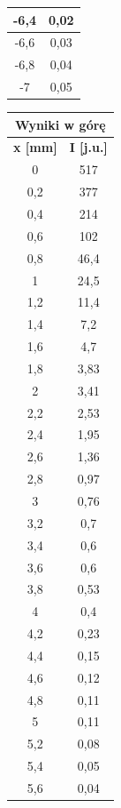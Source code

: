 \documentclass{fizykalab}
\begin{document}
\begin{table}
\begin{tabular}{|c|c|}
        -6,4 & 0,02 \\ \hline
        -6,6 & 0,03 \\ \hline
        -6,8 & 0,04 \\ \hline
        -7 & 0,05 \\ \hline
    \end{tabular}
    \quad
    \quad
    \begin{tabular}{|c|c|}
        \hline
        \multicolumn{2}{|c|}{Wyniki w górę} \\ \hline
        \textbf{x [mm]} & \textbf{I [j.u.]} \\ \hline
        0 & 517 \\ \hline
        0,2 & 377 \\ \hline
        0,4 & 214 \\ \hline
        0,6 & 102 \\ \hline
        0,8 & 46,4 \\ \hline
        1 & 24,5 \\ \hline
        1,2 & 11,4 \\ \hline
        1,4 & 7,2 \\ \hline
        1,6 & 4,7 \\ \hline
        1,8 & 3,83 \\ \hline
        2 & 3,41 \\ \hline
        2,2 & 2,53 \\ \hline
        2,4 & 1,95 \\ \hline
        2,6 & 1,36 \\ \hline
        2,8 & 0,97 \\ \hline
        3 & 0,76 \\ \hline
        3,2 & 0,7 \\ \hline
        3,4 & 0,6 \\ \hline
        3,6 & 0,6 \\ \hline
        3,8 & 0,53 \\ \hline
        4 & 0,4 \\ \hline
        4,2 & 0,23 \\ \hline
        4,4 & 0,15 \\ \hline
        4,6 & 0,12 \\ \hline
        4,8 & 0,11 \\ \hline
        5 & 0,11 \\ \hline
        5,2 & 0,08 \\ \hline
        5,4 & 0,05 \\ \hline
        5,6 & 0,04 \\ \hline

\end{tabular}
\end{table}
\end{document}
